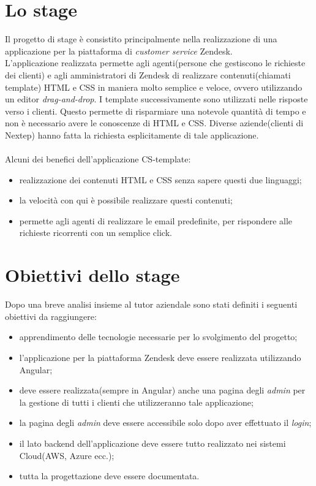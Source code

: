 \section{Lo stage}
Il progetto di stage è consistito principalmente nella realizzazione di una applicazione per la piattaforma di \emph{customer service} Zendesk. \\ L'applicazione realizzata permette agli agenti(persone che gestiscono le richieste dei clienti) e agli amministratori di Zendesk di realizzare contenuti(chiamati template) HTML e CSS in maniera molto semplice e veloce, ovvero utilizzando un editor \emph{drag-and-drop}. I template successivamente sono utilizzati nelle risposte verso i clienti. Questo permette di risparmiare una notevole quantità di tempo e non è necessario avere le conoscenze di HTML e CSS. Diverse aziende(clienti di Nextep) hanno fatta la richiesta esplicitamente di tale applicazione.
\\
\\
Alcuni dei benefici dell'applicazione CS-template:
\begin{itemize}
	\item realizzazione dei contenuti HTML e CSS senza sapere questi due linguaggi;
	\item la velocità con qui è possibile realizzare questi contenuti;
	\item permette agli agenti di realizzare le email predefinite, per rispondere alle richieste ricorrenti con un semplice click.
\end{itemize}
\newpage
\section{ Obiettivi dello stage}
Dopo una breve analisi insieme al tutor aziendale sono stati definiti i  seguenti obiettivi da raggiungere: 
\begin{itemize}
	\item apprendimento delle tecnologie necessarie per lo svolgimento del progetto;
	\item l'applicazione per la piattaforma Zendesk deve essere realizzata utilizzando Angular; 
	\item deve essere realizzata(sempre in Angular) anche una pagina degli \emph{admin} per la gestione di tutti i clienti che utilizzeranno tale applicazione;
	\item la pagina degli \emph{admin} deve essere accessibile solo dopo aver effettuato il \emph{login};
	\item il lato backend dell'applicazione deve essere tutto realizzato nei sistemi Cloud(AWS, Azure ecc.);
	\item tutta la progettazione deve essere documentata.
\end{itemize} 

